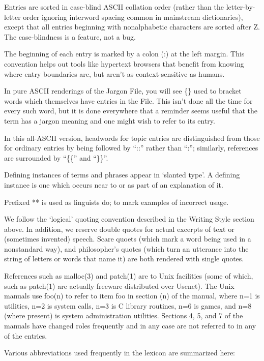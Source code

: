 Entries are sorted in case-blind ASCII collation order (rather than the letter-by-letter order ignoring interword spacing common in
mainstream dictionaries), except that all entries beginning with nonalphabetic characters are sorted after Z. The case-blindness is a
feature, not a bug.

The beginning of each entry is marked by a colon (:) at the left margin. This convention helps out tools like hypertext browsers that
benefit from knowing where entry boundaries are, but aren't as context-sensitive as humans.

In pure ASCII renderings of the Jargon File, you will see \{\} used to bracket words which themselves have entries in the File. This isn't
done all the time for every such word, but it is done everywhere that a reminder seems useful that the term has a jargon meaning and one
might wish to refer to its entry.

In this all-ASCII version, headwords for topic entries are distinguished from those for ordinary entries by being followed by ``::'' rather
than ``:''; similarly, references are surrounded by ``\{\{'' and ``\}\}''.

Defining instances of terms and phrases appear in `slanted type'. A defining instance is one which occurs near to or as part of an
explanation of it.

Prefixed ** is used as linguists do; to mark examples of incorrect usage.

We follow the `logical' quoting convention described in the Writing Style section above. In addition, we reserve double quotes for actual
excerpts of text or (sometimes invented) speech. Scare quoets (which mark a word being used in a nonstandard way), and philosopher's quotes
(which turn an utterance into the string of letters or words that name it) are both rendered with single quotes.

References such as malloc(3) and patch(1) are to Unix facilities (some of which, such as patch(1) are actually freeware distributed over
Usenet). The Unix manuals use foo(n) to refer to item foo in section (n) of the manual, where n=1 is utilities, n=2 is system calls, n=3 is
C library routines, n=6 is games, and n=8 (where present) is system administration utilities. Sections 4, 5, and 7 of the manuals have
changed roles frequently and in any case are not referred to in any of the entries.

Various abbreviations used frequently in the lexicon are summarized here:

